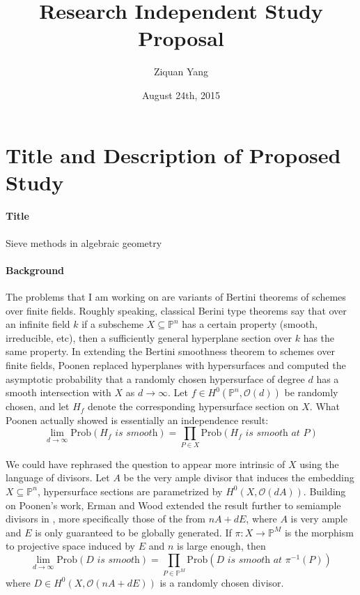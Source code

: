 \documentclass[12pt]{article}
\theoremstyle{plain}
\theoremstyle{definition}
\newcommand{\IP}{\mathbb{P}}
\newcommand{\sO}{\mathcal{O}}
\newcommand{\<}{\langle}
\renewcommand{\>}{\rangle}
\begin{document}
%

\title{Research Independent Study Proposal}
\author{Ziquan Yang}


\date{August 24th, 2015}

\maketitle


 

\setcounter{section}{0}
\section{Title and Description of Proposed Study}
\paragraph{Title} Sieve methods in algebraic geometry
\paragraph{Background}
The problems that I am working on are variants of Bertini theorems of schemes over finite fields. Roughly speaking, classical Berini type theorems say that over an infinite field $k$ if a subscheme $X \subseteq \IP^n$ has a certain property (smooth, irreducible, etc), then a sufficiently general hyperplane section over $k$ has the same property. In extending the Bertini smoothness theorem to schemes over finite fields, Poonen \cite{PBertini} replaced hyperplanes with hypersurfaces and computed the asymptotic probability that a randomly chosen hypersurface of degree $d$ has a smooth intersection with $X$ as $d \to \infty$. Let $f \in H^0(\IP^n, \sO(d))$ be randomly chosen, and let $H_f$ denote the corresponding hypersurface section on $X$. What Poonen actually showed is essentially an independence result:
$$ \lim_{d \to \infty} \mathrm{Prob}(H_f \textit{ is smooth}) = \prod_{P \in X} \mathrm{Prob}(H_f \textit{ is smooth at  }P)$$ 

We could have rephrased the question to appear more intrinsic of $X$ using the language of divisors. Let $A$ be the very ample divisor that induces the embedding $X \subseteq \IP^n$, hypersurface sections are parametrized by $H^0(X, \sO(dA))$. Building on Poonen's work, Erman and Wood extended the result further to semiample divisors in \cite{Wood}, more specifically those of the from $nA + dE$, where $A$ is very ample and $E$ is only guaranteed to be globally generated. If $\pi : X \to \IP^M$ is the morphism to projective space induced by $E$ and $n$ is large enough, then 
$$ \lim_{d \to \infty} \mathrm{Prob}(D \textit{ is smooth}) = \prod_{P \in \IP^M} \mathrm{Prob}(D \textit{ is smooth at  }\pi^{-1}(P))$$  
where $D \in H^0(X, \sO(nA + dE))$ is a randomly chosen divisor.
\end{document}
